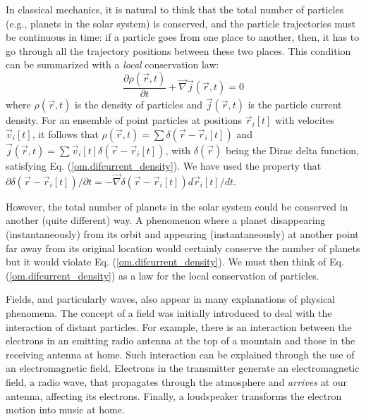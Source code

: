 \documentclass[nofootinbib, secnumarabic, amsmath, nobibnotes,11pt,aps,pra, floatfix]{revtex4-1}
\newcommand{\eref}[1]{Eq. (\ref{#1})}
\begin{document}
In classical mechanics, it is natural to think that the total number
of particles (e.g., planets in the solar system) is conserved, and
the particle trajectories must be continuous in time: if a particle
goes from one place to another, then, it  has to go through all the trajectory
positions between these two places. This condition can be summarized
with a \textit{local} conservation law:
\begin{equation}
\label{om.difcurrent_density}
\frac{\partial\rho(\vec{r},t)}{\partial t} + \vec{\nabla} \vec{j}(\vec{r},t) = 0
\end{equation}
where $\rho(\vec{r},t)$ is the density of particles and
$\vec{j}(\vec{r},t)$ is the particle current density. For an
ensemble of point particles at positions $\vec{r}_i[t]$ with
velocites $\vec{v}_i[t]$, it follows that $\rho(\vec{r},t) =
\sum\delta(\vec{r}-\vec{r}_{i}[t])$ and $\vec{j}(\vec{r},t) =
\sum\vec{v}_{i}[t] \delta(\vec{r}-\vec{r}_{i}[t])$, with
$\delta(\vec{r})$ being the Dirac delta function, satisfying \eref{om.difcurrent_density}. We have used the property that ${\partial \delta(\vec{r}-\vec{r}_{i}[t])}/{\partial t}= -\vec{\nabla} \delta(\vec{r}-\vec{r}_{i}[t]) {d \vec{r}_{i}[t]}/{dt}$.

However, the total number of planets in the solar system could be conserved in another (quite different) way.
A phenomenon where a planet disappearing (instantaneously) from its orbit and appearing (instantaneously) at another point far away from its original location would certainly conserve the number of planets but it would violate \eref{om.difcurrent_density}. We must then think of \eref{om.difcurrent_density} as a law for the local conservation of particles.

Fields, and particularly waves, also appear in many explanations of
physical phenomena. The concept of a field was initially introduced
to deal with the interaction of distant particles.  For example,
there is an interaction between the electrons in an emitting radio
antenna at the top of a mountain and those in the receiving antenna
at home. Such interaction can be explained through the use of an
electromagnetic field. Electrons in the transmitter generate an
electromagnetic field, a radio wave, that propagates through the
atmosphere and \textit{arrives} at our antenna, affecting its
electrons. Finally, a loudspeaker transforms the electron motion
into music at home.
\end{document}

